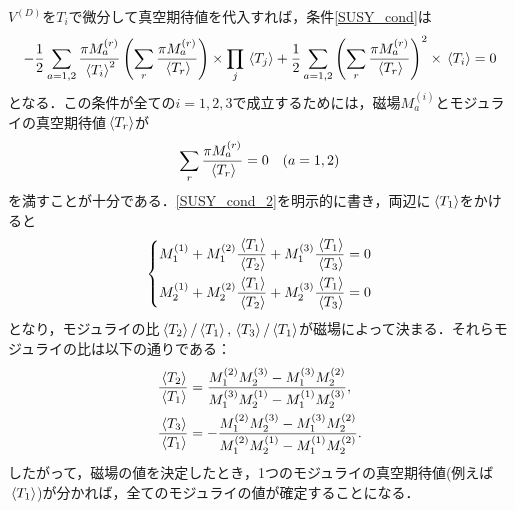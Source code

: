 \documentclass[a4paper,uplatex,dvipdfmx]{jsarticle}
\theoremstyle{definition}
\begin{document}
$V^{(D)}$を$T_{i}$で微分して真空期待値を代入すれば，条件\eqref{SUSY_cond}は
\begin{equation}
   -
   \frac{1}{2}\sum_{a=1,2}
   \frac{\pi M_{a}^{(r)}}{\ev*{T_{i}}^{2}}
   \left(  
      \sum_{r}\frac{\pi M_{a}^{(r)}}{\ev*{T_{r}}}
   \right)
   \times
   \prod_{j}
   \ev*{T_{j}}
   +
   \frac{1}{2}
   \sum_{a=1,2}
   \left(  
      \sum_{r}\frac{\pi M_{a}^{(r)}}{\ev*{T_{r}}}
   \right)^2
   \times
   \ev*{T_{i}}
   =
   0
   \nonumber
\end{equation}
となる．この条件が全ての$i=1,2,3$で成立するためには，磁場$M_{a}^{(i)}$とモジュライの真空期待値$\ev*{T_{r}}$が
\begin{equation}
   \sum_{r}\frac{\pi M_{a}^{(r)}}{\ev*{T_{r}}}
   =
   0
   \quad
   (a=1,2)   
   \label{SUSY_cond_2}
\end{equation}
を満すことが十分である．\eqref{SUSY_cond_2}を明示的に書き，両辺に$\ev*{T_{1}}$をかけると
\begin{equation}
   \left\{
      \begin{alignedat}{1}
         M_{1}^{(1)}
         +
         M_{1}^{(2)}\frac{\ev*{T_{1}}}{\ev*{T_{2}}}
         +
         M_{1}^{(3)}\frac{\ev*{T_{1}}}{\ev*{T_{3}}}
         &=
         0
         \\
         M_{2}^{(1)}
         +
         M_{2}^{(2)}\frac{\ev*{T_{1}}}{\ev*{T_{2}}}
         +
         M_{2}^{(3)}\frac{\ev*{T_{1}}}{\ev*{T_{3}}}
         &=
         0
      \end{alignedat}
   \right.
   \nonumber
\end{equation}
となり，モジュライの比$\ev*{T_{2}}/\ev*{T_{1}},\ev*{T_{3}}/\ev*{T_{1}}$が磁場によって決まる．それらモジュライの比は以下の通りである：
\begin{align}
   \frac{\ev*{T_{2}}}{\ev*{T_{1}}}
   &=
   \frac{ M_{1}^{(2)} M_{2}^{(3)}- M_{1}^{(3)} M_{2}^{(2)}}{M_{1}^{(3)} M_{2}^{(1)}-M_{1}^{(1)} M_{2}^{(3)}}
   ,
   \label{torus_area_ratio1}
   \\
   \frac{\ev*{T_{3}}}{\ev*{T_{1}}}
   &=
   -\frac{ M_{1}^{(2)} M_{2}^{(3)}-M_{1}^{(3)} M_{2}^{(2)}}{M_{1}^{(2)} M_{2}^{(1)}-M_{1}^{(1)} M_{2}^{(2)}}
   .
   \label{torus_area_ratio2}
\end{align}
したがって，磁場の値を決定したとき，1つのモジュライの真空期待値(例えば$\ev*{T_{1}}$)が分かれば，全てのモジュライの値が確定することになる．
\end{document}
